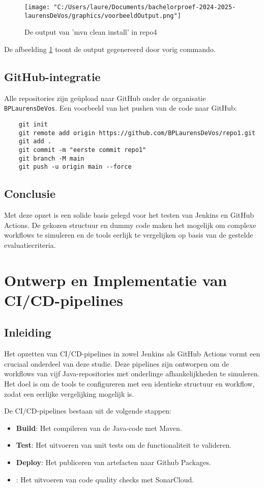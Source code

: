 \begin{figure}[h!]
    \centering
    \texttt{[image: "C:/Users/laure/Documents/bachelorproef-2024-2025-laurensDeVos/graphics/voorbeeldOutput.png"]}
    \caption{De output van 'mvn clean install' in repo4}
    \label{fig:mvncleaninstall}
\end{figure}

De afbeelding \ref{fig:mvncleaninstall} toont de output gegenereerd door vorig commando.


\subsection{GitHub-integratie}
Alle repositories zijn geüpload naar GitHub onder de organisatie \texttt{BPLaurensDeVos}. Een voorbeeld van het pushen van de code naar GitHub:

\begin{verbatim}
    git init
    git remote add origin https://github.com/BPLaurensDeVos/repo1.git
    git add .
    git commit -m "eerste commit repo1"
    git branch -M main
    git push -u origin main --force
\end{verbatim}

\subsection{Conclusie}
Met deze opzet is een solide basis gelegd voor het testen van Jenkins en GitHub Actions. De gekozen structuur en dummy code maken het mogelijk om complexe workflows te simuleren en de tools eerlijk te vergelijken op basis van de gestelde evaluatiecriteria.


\section{Ontwerp en Implementatie van CI/CD-pipelines}

\subsection{Inleiding}
Het opzetten van CI/CD-pipelines in zowel Jenkins als GitHub Actions vormt een cruciaal onderdeel van deze studie. Deze pipelines zijn ontworpen om de workflows van vijf Java-repositories met onderlinge afhankelijkheden te simuleren. Het doel is om de tools te configureren met een identieke structuur en workflow, zodat een eerlijke vergelijking mogelijk is.

De CI/CD-pipelines bestaan uit de volgende stappen:
\begin{itemize}
    \item \textbf{Build}: Het compileren van de Java-code met Maven.
    \item \textbf{Test}: Het uitvoeren van unit tests om de functionaliteit te valideren.
    \item \textbf{Deploy}: Het publiceren van artefacten naar Github Packages.
    \item {}: Het uitvoeren van code quality checks met SonarCloud.
\end{itemize}

